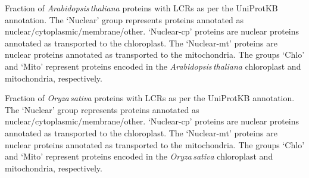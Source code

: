 \documentclass[a4paper,12pt]{article}
\newcommand{\arab}{\mbox{\textit{Arabidopsis\,thaliana}}\xspace}
\newcommand{\oryz}{\mbox{\textit{Oryza\,sativa}}\xspace}
\begin{document}
\renewcommand{\location}{arab_genbank_lcrproportions}
\renewcommand{\nucNumber}{5554}
\renewcommand{\nucChloNumber}{3456}
\renewcommand{\nucMitoNumber}{814}
\renewcommand{\chloNumber}{79}
\renewcommand{\mitoNumber}{111}
\begin{figure*}[ht]
    \caption{UniProtKB -- \arab}
    
    \centering\parbox{0.9\textwidth}{\footnotesize Fraction of \arab proteins
    with LCRs as per the UniProtKB annotation.  The `Nuclear' group represents
    proteins annotated as nuclear/cytoplasmic/membrane/other. `Nuclear-cp'
    proteins are nuclear proteins annotated as transported to the chloroplast.
    The `Nuclear-mt' proteins are nuclear proteins annotated as transported
    to the mitochondria.  The groups `Chlo' and `Mito' represent proteins
    encoded in the \arab chloroplast and mitochondria, respectively.}
    \label{fig:histogramgenbankarab}
\end{figure*}

\renewcommand{\location}{oryz_genbank_lcrproportions}
\renewcommand{\nucNumber}{9618}
\renewcommand{\nucChloNumber}{610}
\renewcommand{\nucMitoNumber}{371}
\renewcommand{\chloNumber}{83}
\renewcommand{\mitoNumber}{60}
\begin{figure*}[ht]
    \caption{UniProtKB -- \oryz}
    
    \centering\parbox{0.9\textwidth}{\footnotesize Fraction of \oryz proteins
    with LCRs as per the UniProtKB annotation.  The `Nuclear' group represents
    proteins annotated as nuclear/cytoplasmic/membrane/other. `Nuclear-cp'
    proteins are nuclear proteins annotated as transported to the chloroplast.
    The `Nuclear-mt' proteins are nuclear proteins annotated as transported
    to the mitochondria.  The groups `Chlo' and `Mito' represent proteins
    encoded in the \oryz chloroplast and mitochondria, respectively.}
    \label{fig:histogramgenbankoryz}
\end{figure*}
\end{document}
